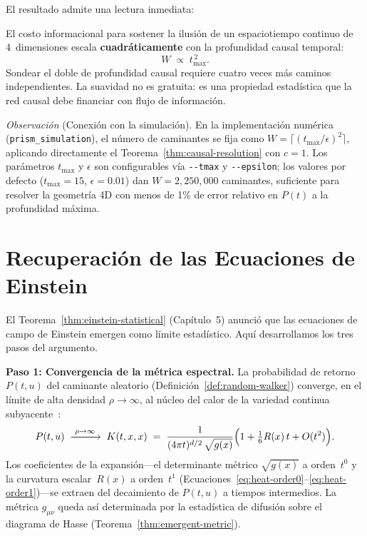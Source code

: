 \documentclass[11pt, a4paper, openany]{book}
\begin{document}
\noindent
El resultado admite una lectura inmediata:

\begin{result}[title={El Precio de la Suavidad}]
\label{res:price-of-smoothness}
El costo informacional para sostener la ilusi\'on de un espaciotiempo
continuo de 4~dimensiones escala \textbf{cuadr\'aticamente} con la
profundidad causal temporal:
\[
  W \;\propto\; t_{\max}^{\,2}.
\]
Sondear el doble de profundidad causal requiere cuatro veces m\'as
caminos independientes. La suavidad no es gratuita: es una propiedad
estad\'istica que la red causal debe financiar con flujo de
informaci\'on.
\end{result}

\noindent\textit{Observaci\'on} (Conexi\'on con la simulaci\'on).
En la implementaci\'on num\'erica (\texttt{prism\_simulation}), el
n\'umero de caminantes se fija como
$W = \lceil(t_{\max}/\epsilon)^2\rceil$, aplicando directamente
el Teorema~\ref{thm:causal-resolution} con $c = 1$. Los par\'ametros
$t_{\max}$ y $\epsilon$ son configurables v\'ia \texttt{-{}-tmax} y
\texttt{-{}-epsilon}; los valores por defecto ($t_{\max}=15$,
$\epsilon=0{.}01$) dan $W = 2{,}250{,}000$ caminantes, suficiente
para resolver la geometr\'ia 4D con menos de 1\% de error relativo
en $P(t)$ a la profundidad m\'axima.

\medskip

\section{Recuperaci\'on de las Ecuaciones de Einstein}

El Teorema~\ref{thm:einstein-statistical} (Cap\'itulo~5) anunci\'o que
las ecuaciones de campo de Einstein emergen como l\'imite
estad\'istico. Aqu\'i desarrollamos los tres pasos del argumento.

\medskip
\noindent\textbf{Paso 1: Convergencia de la m\'etrica espectral.}
La probabilidad de retorno $P(t,u)$ del caminante aleatorio
(Definici\'on~\ref{def:random-walker}) converge, en el l\'imite de
alta densidad $\rho \to \infty$, al n\'ucleo del calor de la
variedad continua subyacente~\cite{benincasa2010,dowker2013}:
\[
  P(t,u) \;\xrightarrow{\;\rho\to\infty\;}
  \; K(t,x,x)
  \;=\; \frac{1}{(4\pi t)^{d/2}\,\sqrt{g(x)}}
  \Bigl(1 + \tfrac{1}{6}R(x)\,t + O(t^2)\Bigr).
\]
Los coeficientes de la expansi\'on---el determinante m\'etrico
$\sqrt{g(x)}$ a orden~$t^0$ y la curvatura escalar~$R(x)$ a
orden~$t^1$
(Ecuaciones~\eqref{eq:heat-order0}--\eqref{eq:heat-order1})---se
extraen del decaimiento de $P(t,u)$ a tiempos intermedios. La
m\'etrica $g_{\mu\nu}$ queda as\'i determinada por la estad\'istica
de difusi\'on sobre el diagrama de Hasse
(Teorema~\ref{thm:emergent-metric}).
\end{document}
